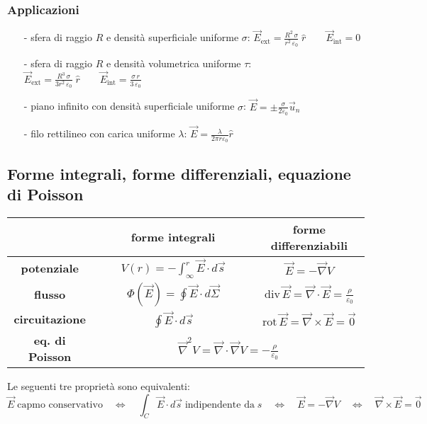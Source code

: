 \documentclass[a4paper]{article}
\newcommand\un{\vec{u}_n}
\newcommand\nab{\vec{\nabla}} %
\begin{document}
\subsubsection*{Applicazioni}
\begin{itemize}[topsep=3pt, itemsep=0pt]
	\item[-] sfera di raggio \(R\) e densità superficiale uniforme \(\sigma\): \(\displaystyle \vec{E}_\text{ext} = \frac{R^2 \, \sigma}{r^2 \, \varepsilon_0} \; \hat{r} \qquad \vec{E}_\text{int} = 0\)
	\item[-] sfera di raggio \(R\) e densità volumetrica uniforme \(\tau\): \(\displaystyle \vec{E}_\text{ext} = \frac{R^3 \, \sigma}{3 r^2 \, \varepsilon_0} \; \hat{r} \qquad \vec{E}_\text{int} = \frac{\sigma \, r}{3 \, \varepsilon_0}\)
	\item[-] piano infinito con densità superficiale uniforme \(\sigma\): \(\displaystyle \vec{E} = \pm \frac{\sigma}{2 \varepsilon_0} \un\)
	\item[-] filo rettilineo con carica uniforme \(\lambda\): \(\displaystyle \vec{E} = \frac{\lambda}{2 \pi r \varepsilon_0} \hat{r}\)
\end{itemize}

\subsection{Forme integrali, forme differenziali, equazione di Poisson}
\begin{center}
	\def\arraystretch{2.5}
	\begin{tabular}{c c c}
		& \textbf{forme integrali} & \textbf{forme differenziabili} \\
		\toprule
		\textbf{potenziale} & \(\displaystyle \qquad V(r) = - \int_\infty^r \vec{E} \cdot d\vec{s} \qquad\) & \(\displaystyle \vec{E} = - \nab V\) \\[7pt]
		\hline
		\textbf{flusso} & \(\displaystyle \qquad \Phi(\vec{E}) = \oint \vec{E} \cdot d\vec{\Sigma} \qquad\) & \(\displaystyle \text{div} \, \vec{E} = \nab \cdot \vec{E} = \frac{\rho}{\varepsilon_0}\) \\[7pt]
		\hline
		\textbf{circuitazione} & \(\displaystyle \qquad \oint \vec{E} \cdot d\vec{s} \qquad\) & \(\displaystyle \text{rot} \, \vec{E} = \nab \times \vec{E} = \vec{0}\) \\[7pt]
		\bottomrule
		\bottomrule
		\textbf{eq. di Poisson} & \multicolumn{2}{c}{\(\displaystyle \nab^2 V = \nab \cdot \nab V = - \frac{\rho}{\varepsilon_0}\)} \\
		\bottomrule
	\end{tabular}
\end{center}
Le seguenti tre proprietà sono equivalenti:
\[\vec{E} \; \text{capmo conservativo} \quad \Leftrightarrow \quad \int_C \vec{E} \cdot d\vec{s} \; \text{indipendente da} \; s \quad \Leftrightarrow \quad \vec{E} = - \nab V \quad \Leftrightarrow \quad \nab \times \vec{E} = \vec{0}\]
\end{document}
